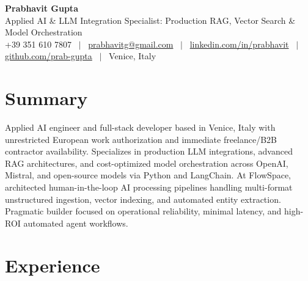 \documentclass[a4paper,10pt]{article}
\begin{document}
\begin{minipage}[c]{0.80\textwidth}
 {\Huge\bfseries Prabhavit Gupta}\\[3pt]
 {\color{accent}\large Applied AI \& LLM Integration Specialist: Production RAG, Vector Search \& Model Orchestration}\\[6pt]
 {\footnotesize +39 351 610 7807 ~$\vert$~
 \href{mailto:prabhavitg@gmail.com}{prabhavitg@gmail.com} ~$\vert$~
 \href{https://www.linkedin.com/in/prabhavit/}{linkedin.com/in/prabhavit} ~$\vert$~
 \href{https://github.com/prab-gupta}{github.com/prab-gupta} ~$\vert$~
 Venice, Italy}
\end{minipage}\hfill

\section{Summary}
Applied AI engineer and full-stack developer based in Venice, Italy with unrestricted European work authorization and immediate freelance/B2B contractor availability. Specializes in production LLM integrations, advanced RAG architectures, and cost-optimized model orchestration across OpenAI, Mistral, and open-source models via Python and LangChain. At FlowSpace, architected human-in-the-loop AI processing pipelines handling multi-format unstructured ingestion, vector indexing, and automated entity extraction. Pragmatic builder focused on operational reliability, minimal latency, and high-ROI automated agent workflows.

\section{Experience}
\end{document}
